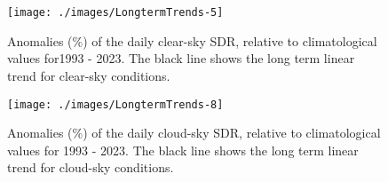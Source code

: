 
%
%
%
%



\appendixstart
\appendix
\section[\appendixname~\thesection]{}




\begin{figure}[h!]
    {\centering
        \texttt{[image: ./images/LongtermTrends-5]}

    }
    \caption{Anomalies (\%) of the daily clear-sky SDR, relative to climatological values for1993 - 2023. The black line shows the long term linear trend for clear-sky conditions.}\label{fig:trendCLEAR}
\end{figure}



\begin{figure}[h!]
    {\centering
        \texttt{[image: ./images/LongtermTrends-8]}

    }
    \caption{Anomalies (\%) of the daily cloud-sky SDR, relative to climatological values for 1993 - 2023. The black line shows the long term linear trend for cloud-sky conditions.}\label{fig:trendCLOUD}
\end{figure}



